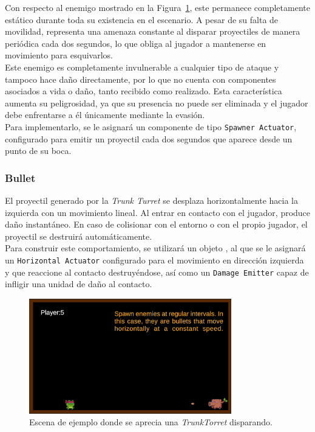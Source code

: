 Con respecto al enemigo mostrado en la Figura~\ref{fig:TrunkTurret}, este permanece completamente estático durante toda su existencia en el escenario. A pesar de su falta de movilidad, representa una amenaza constante al disparar proyectiles de manera periódica cada dos segundos, lo que obliga al jugador a mantenerse en movimiento para esquivarlos.\\

Este enemigo es completamente invulnerable  a cualquier tipo de ataque y tampoco hace daño directamente, por lo que no cuenta con componentes asociados a vida o daño, tanto recibido como realizado. Esta característica aumenta su peligrosidad, ya que su presencia no puede ser eliminada y el jugador debe enfrentarse a él únicamente mediante la evasión.\\

Para implementarlo, se le asignará un componente de tipo \texttt{Spawner Actuator}, configurado para emitir un proyectil cada dos segundos que aparece desde un punto de su boca.
\subsubsection{Bullet}

El proyectil generado por la \textit{Trunk Turret} se desplaza horizontalmente hacia la izquierda con un movimiento lineal. Al entrar en contacto con el jugador, produce daño instantáneo. En caso de colisionar con el entorno o con el propio jugador, el proyectil se destruirá automáticamente.\\

Para construir este comportamiento, se utilizará un objeto , al que se le asignará un \texttt{Horizontal Actuator} configurado para el movimiento en dirección izquierda y que reaccione al contacto destruyéndose, así como un \texttt{Damage Emitter} capaz de infligir una unidad de daño al contacto. 


\begin{figure}[t]
	\centering
	\includegraphics[height=5cm]{Imagenes/TrunkTorret.png}
	\caption{Escena de ejemplo donde se aprecia una \textit{TrunkTorret} disparando.}
	\label{fig:TrunkTurret}
\end{figure}
